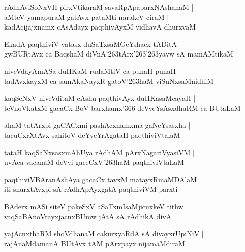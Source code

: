 \begin{shloka}
rAdhAviSoNxVH pirxVtikaraM savaRpApaparxNAshanaM |\\
aMteV yamapuraM gatAvx pataMti narakeV ciraM |\\
kadAcijajxnamx cAsAdayx paqthivAyxM vidhavA dhurxvaM
\end{shloka}

\begin{shloka}
EkadA paqthiviV vatasx duSaTxsaMGeYshacx tADitA |\\
gwBURtAvx ca BaqshaM diVnA\char'263tArx\char'263\char'263yayw sA mamAMtikaM
\end{shloka}

\begin{shloka}
niveVdayAmASa duHKaM rudaMtiV ca punaH punaH |\\
tadAvxkayxM ca samAkaNayxR gatoV\char'263haM viSuNxsaMnidhiM
\end{shloka}

\begin{shloka}
kaqSeNxV niveVditaM cAshu paqthivAyx duHKasaMcayaH |\\
teVnoVkatxM gacaCx BoV barxhamx\char'366 deVveYsAsxdhaRM ca BUtaLaM 
\end{shloka}

\begin{shloka}
ahaM tatArxpi gaCACxmi pashAcxnamxma gaNeYsasxha |\\
tacuCxrXtAvx sahitoV deYveYrAgataH paqthiviVtalaM
\end{shloka}

\begin{shloka}
tataH kaqSaNxsasxmAhUya rAdhAM pArxNagariVyasiVM |\\
uvAca vacanaM deVvi gaceCxV\char'263haM paqthiviVtaLaM
\end{shloka}

\begin{shloka}
paqthiviVBAranAshAya gacaCx tavxM matayxRmaMDAlaM |\\
iti shurxtAvxpi sA rAdhApAyxgatA paqthiviVM parxti
\end{shloka}

\begin{shloka}
BAderx mASi siteV pakeSxV aSaTxmIsaMjicnxkeV tithw |\\
vaqSaBAnoVrayxjacnxBUmw jAtA sA rAdhikA divA
\end{shloka}

\begin{shloka}
yajAcnxthaRM shoVdhanaM cakurxyaRdA sA divayxrUpiNiV |\\
rajAnaMdamanA BUtAvx tAM pArxpayx nijamaMdiraM
\end{shloka}

